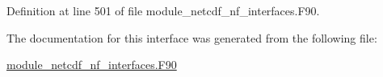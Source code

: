 Definition at line 501 of file module\+\_\+netcdf\+\_\+nf\+\_\+interfaces.\+F90.



The documentation for this interface was generated from the following file\+:\begin{DoxyCompactItemize}
\item 
\hyperlink{module__netcdf__nf__interfaces_8F90}{module\+\_\+netcdf\+\_\+nf\+\_\+interfaces.\+F90}\end{DoxyCompactItemize}
